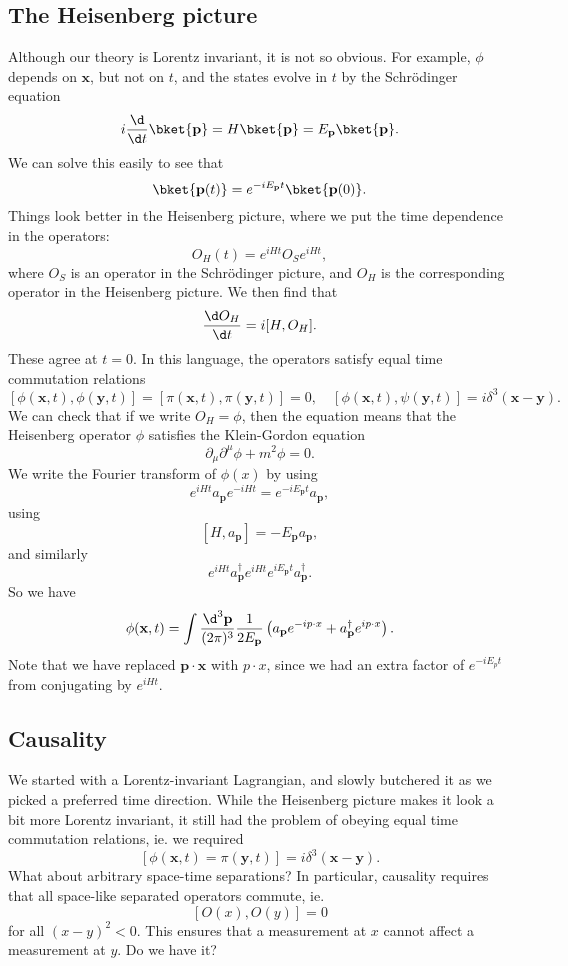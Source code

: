 \documentclass[a4paper]{article}
\begin{document}
\subsection{The Heisenberg picture}
Although our theory is Lorentz invariant, it is not so obvious. For example, $\phi$ depends on $\mathbf{x}$, but not on $t$, and the states evolve in $t$ by the Schr\"odinger equation
\[
  i \frac{\d}{\d t}\bket{\mathbf{p}} = H\bket{\mathbf{p}} = E_\mathbf{p} \bket{\mathbf{p}}.
\]
We can solve this easily to see that
\[
  \bket{\mathbf{p}(t)} = e^{-iE_\mathbf{p} t} \bket{\mathbf{p}(0)}.
\]
Things look better in the Heisenberg picture, where we put the time dependence in the operators:
\[
  O_H(t) = e^{iHt} O_S e^{iHt},
\]
where $O_S$ is an operator in the Schr\"odinger picture, and $O_H$ is the corresponding operator in the Heisenberg picture. We then find that
\[
  \frac{\d O_H}{\d t} = i [H, O_H].
\]
These agree at $t = 0$. In this language, the operators satisfy equal time commutation relations
\[
  [\phi(\mathbf{x}, t), \phi(\mathbf{y}, t)] = [\pi(\mathbf{x}, t), \pi(\mathbf{y}, t)] = 0,\quad [\phi(\mathbf{x}, t), \psi(\mathbf{y}, t)] = i \delta^3(\mathbf{x} - \mathbf{y}).
\]
We can check that if we write $O_H = \phi$, then the equation means that the Heisenberg operator $\phi$ satisfies the Klein-Gordon equation
\[
  \partial_\mu \partial^\mu \phi + m^2 \phi = 0.
\]
We write the Fourier transform of $\phi(x)$ by using
\[
  e^{iHt}a_\mathbf{p} e^{-iHt} = e ^{-iE_\mathbf{p} t}a_\mathbf{p},
\]
using
\[
  [H, a_\mathbf{p}] = -E_\mathbf{p} a_\mathbf{p},
\]
and similarly
\[
  e^{iHt} a_\mathbf{p}^\dagger e^{iHt} e^{iE_\mathbf{p} t} a_\mathbf{p}^\dagger.
\]
So we have
\[
  \phi(\mathbf{x}, t) = \int \frac{\d^3 \mathbf{p}}{(2\pi)^3}\frac{1}{2 E_\mathbf{p}} \left(a_\mathbf{p} e^{-ip \cdot x} + a_\mathbf{p}^\dagger e^{i p \cdot x}\right).
\]
Note that we have replaced $\mathbf{p}\cdot \mathbf{x}$ with $p \cdot x$, since we had an extra factor of $e^{-iE_p t}$ from conjugating by $e^{iHt}$.

\subsection{Causality}
We started with a Lorentz-invariant Lagrangian, and slowly butchered it as we picked a preferred time direction. While the Heisenberg picture makes it look a bit more Lorentz invariant, it still had the problem of obeying equal time commutation relations, ie. we required
\[
  [\phi(\mathbf{x}, t) = \pi(\mathbf{y}, t)] = i \delta^3(\mathbf{x} - \mathbf{y}).
\]
What about arbitrary space-time separations? In particular, causality requires that all space-like separated operators commute, ie.
\[
  [O(x), O(y)] = 0
\]
for all $(x - y)^2 < 0$. This ensures that a measurement at $x$ cannot affect a measurement at $y$. Do we have it?
\end{document}
